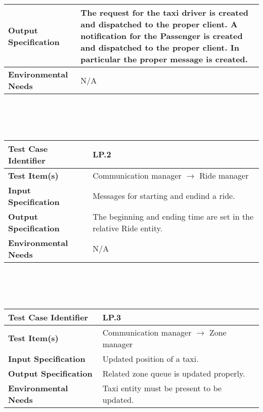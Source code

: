 {\begin{tabularx}{\textwidth}{l X}
    \textbf{Output Specification} & The request for the taxi driver is created and dispatched to the proper client. A notification for the Passenger is created and dispatched to the proper client. In particular the proper message is created.   \\
    \hline 
    
    \textbf{Environmental Needs} &  N/A \\
    \hline

\end{tabularx}
\\ \\ \\
\begin{tabularx}{\textwidth}{l X}
    \hline 
    \textbf{Test Case Identifier} & LP.2\\ 
    \hline 
    
    \textbf{Test Item(s)} & Communication manager $\rightarrow$ Ride manager\\
    \hline 
    
    \textbf{Input Specification} &  Messages for starting and endind a ride.\\
    \hline 
    
    \textbf{Output Specification} &  The beginning and ending time are set in the relative Ride entity.\\
    \hline 
    
    \textbf{Environmental Needs} & N/A \\
    \hline

\end{tabularx}
\\ \\ \\
\begin{tabularx}{\textwidth}{l X}
    \hline 
    \textbf{Test Case Identifier} & LP.3\\ 
    \hline 
    
    \textbf{Test Item(s)} & Communication manager $\rightarrow$ Zone manager\\
    \hline 
    
    \textbf{Input Specification} & Updated position of a taxi. \\
    \hline 
    
    \textbf{Output Specification} & Related zone queue is updated properly. \\
    \hline 
    
    \textbf{Environmental Needs} & Taxi entity must be present to be updated.  \\
    \hline


\end{tabularx}}
